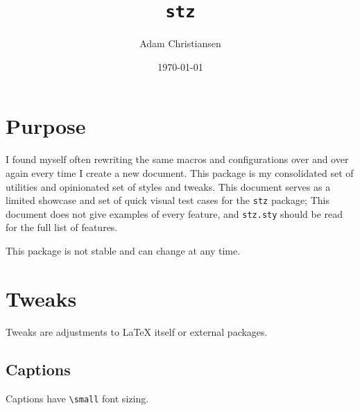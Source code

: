 \documentclass[10pt,titlepage]{article}
\title{\texttt{stz}}
\author{Adam Christiansen}
\date{\today}
\newcommand*{\code}[1]{\texttt{#1}}
\begin{document}
\maketitle
\tableofcontents
\clearpage


\section{Purpose}

I found myself often rewriting the same macros and configurations
over and over again every time I create a new document.
This package is my consolidated set of utilities
and opinionated set of styles and tweaks.
This document serves as a limited showcase
and set of quick visual test cases for the \code{stz} package;
This document does not give examples of every feature,
and \code{stz.sty} should be read for the full list of features.

\begin{caution}
  This package is not stable and can change at any time.
\end{caution}


\section{Tweaks}

Tweaks are adjustments to LaTeX itself or external packages.


\subsection{Captions}

Captions have \verb|\small| font sizing.
\end{document}
